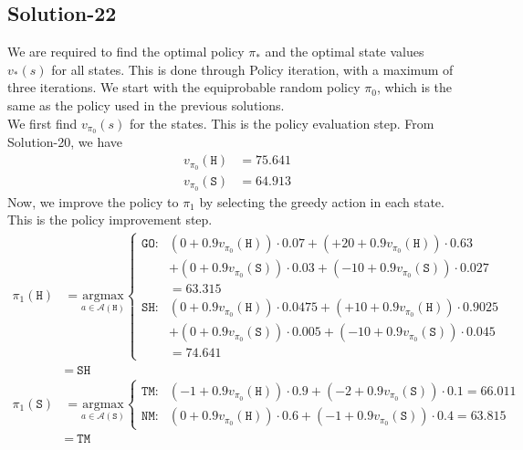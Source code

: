 \documentclass[11pt]{article}
\begin{document}
    \subsection*{Solution-22}
    We are required to find the optimal policy $\pi_{*}$ and the optimal state values $v_{*}(s)$ for all states.
    This is done through Policy iteration, with a maximum of three iterations. We start with the equiprobable
    random policy $\pi_{0}$, which is the same as the policy used in the previous solutions. \\
    We first find $v_{\pi_{0}}(s)$ for the states. This is the policy evaluation step. From Solution-20, we have
    \begin{align*}
        v_{\pi_{0}}(\texttt{H}) &= 75.641 \\
        v_{\pi_{0}}(\texttt{S}) &= 64.913
    \end{align*}
    Now, we improve the policy to $\pi_{1}$ by selecting the greedy action in each state. This is the policy improvement step.
    \begin{align*}
        \pi_{1}(\texttt{H}) &= \underset{a \in \mathcal{A}(\texttt{H})}{\mathrm{argmax}} \begin{cases}
            \texttt{GO} : & (0 + 0.9 v_{\pi_{0}}(\texttt{H})) \cdot 0.07 + (+20 + 0.9 v_{\pi_{0}}(\texttt{H})) \cdot 0.63 \\
            &+ (0 + 0.9 v_{\pi_{0}}(\texttt{S})) \cdot 0.03 + (-10 + 0.9 v_{\pi_{0}}(\texttt{S})) \cdot 0.027 \\
            &= 63.315 \\
            \texttt{SH} : & (0 + 0.9 v_{\pi_{0}}(\texttt{H})) \cdot 0.0475 + (+10 + 0.9 v_{\pi_{0}}(\texttt{H})) \cdot 0.9025 \\
            &+ (0 + 0.9 v_{\pi_{0}}(\texttt{S})) \cdot 0.005 + (-10 + 0.9 v_{\pi_{0}}(\texttt{S})) \cdot 0.045 \\
            &= 74.641
        \end{cases} \\
        &= \ \texttt{SH} \\
        \pi_{1}(\texttt{S}) &= \underset{a \in \mathcal{A}(\texttt{S})}{\mathrm{argmax}} \begin{cases}
            \texttt{TM} : & (-1 + 0.9 v_{\pi_{0}}(\texttt{H})) \cdot 0.9 + (-2 + 0.9 v_{\pi_{0}}(\texttt{S})) \cdot 0.1 = 66.011 \\
            \texttt{NM} : & (0 + 0.9 v_{\pi_{0}}(\texttt{H})) \cdot 0.6 + (-1 + 0.9 v_{\pi_{0}}(\texttt{S})) \cdot 0.4 = 63.815
        \end{cases} \\
        &= \ \texttt{TM}
    \end{align*}
\end{document}
